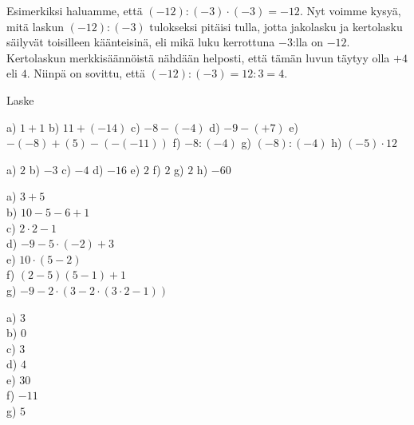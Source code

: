 Esimerkiksi haluamme, että $(-12):(-3)\cdot (-3)=-12$. Nyt voimme kysyä, mitä laskun $(-12):(-3)$ tulokseksi pitäisi tulla, jotta jakolasku ja kertolasku säilyvät toisilleen käänteisinä, eli mikä luku kerrottuna $-3$:lla on $-12$. Kertolaskun merkkisäännöistä nähdään helposti, että tämän luvun täytyy olla $+4$ eli $4$. Niinpä on sovittu, että $(-12):(-3)=12:3=4$.

Laske

\begin{tehtava}
    a) $1+1$
    b) $11+(-14)$
    c) $-8-(-4)$
    d) $-9-(+7)$
    e) $-(-8)+(5)-(-(-11))$
    f) $-8:(-4)$
    g) $(-8):(-4)$
    h) $(-5)\cdot 12$

    \begin{vastaus}
        a) $2$
        b) $-3$
        c) $-4$
        d) $-16$
        e) $2$
        f) $2$
        g) $2$
        h) $-60$
    \end{vastaus}
\end{tehtava}

\begin{tehtava}
a) $3+5$ \\
b) $10-5-6+1$ \\
c) $2 \cdot 2 - 1$ \\
d) $-9 - 5 \cdot (-2) + 3$ \\
e) $10 \cdot (5 - 2)$ \\
f) $(2-5)(5 - 1) + 1$ \\
g) $-9 - 2 \cdot ( 3 - 2 \cdot (3\cdot2 - 1))$
\begin{vastaus} 
a) $3$ \\
b) $0$ \\
c) $3$ \\
d) $4$ \\
e) $30$ \\
f) $-11$ \\
g) $5$ \\
\end{vastaus}
\end{tehtava}
